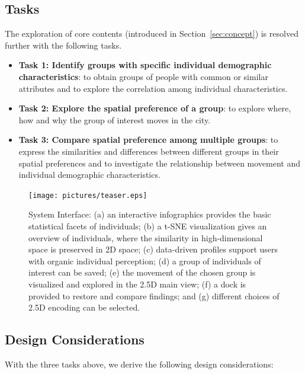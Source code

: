 \documentclass{ieeeaccess}
\begin{document}
\subsection{Tasks}

The exploration of core contents (introduced in Section~\ref{sec:concept}) is resolved further with the following tasks.

\begin{itemize}
\item \textbf{Task 1: Identify groups with specific individual demographic characteristics}: to obtain groups of people with common or similar attributes and to explore the correlation among individual characteristics.
\item \textbf{Task 2: Explore the spatial preference of a group}: to explore where, how and why the group of interest moves in the city.
\item \textbf{Task 3: Compare spatial preference among multiple groups}: to express the similarities and differences between different groups in their spatial preferences and to investigate the relationship between movement and individual demographic characteristics.
\end{itemize}

\begin{figure}[htb!]
 \centering
 \texttt{[image: pictures/teaser.eps]}
 \caption{System Interface: (a) an interactive infographics provides the basic statistical facets of individuals; (b) a t-SNE visualization gives an overview of individuals, where the similarity in high-dimensional space is preserved in 2D space; (c) data-driven profiles support users with organic individual perception; (d) a group of individuals of interest can be saved; (e) the movement of the chosen group is visualized and explored in the 2.5D main view; (f) a dock is provided to restore and compare findings; and (g) different choices of 2.5D encoding can be selected.}
 \label{fig:teaser}
\end{figure}

\subsection{Design Considerations}

With the three tasks above, we derive the following design considerations:
\end{document}
